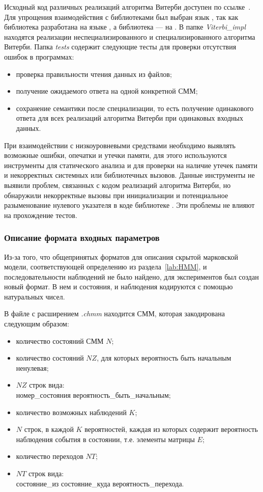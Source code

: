 Исходный код различных реализаций алгоритма Витерби доступен 
по ссылке~\cite{repo}.
Для упрощения взаимодействия с библиотеками был выбран язык 
\CPP, так как библиотека  
разработана на языке , а библиотека  --- на \CPP.
В папке \emph{Viterbi\_impl} находятся реализации
неспециализированного и специализированного алгоритма Витерби.
Папка \emph{tests} содержит следующие тесты для проверки 
отсутствия ошибок в программах:
\begin{itemize}
	\item проверка правильности чтения данных из файлов;
	\item получение ожидаемого ответа на одной конкретной СММ;
	\item сохранение семантики после специализации, то есть 
	получение одинакового ответа для всех реализаций 
	алгоритма Витерби при одинаковых входных данных.
\end{itemize} 
При взаимодействии с низкоуровневыми средствами
необходимо выявлять возможные ошибки, опечатки и утечки 
памяти, для этого используются инструменты  
для статического анализа и  для проверки на 
наличие утечек памяти и некорректных системных или 
библиотечных вызовов.
Данные инструменты не выявили проблем, связанных с кодом 
реализаций алгоритма Витерби, но обнаружили некорректные 
вызовы при инициализации  и потенциальное 
разыменование нулевого указателя в коде библиотеке .
Эти проблемы не влияют на прохождение тестов.

\subsubsection{Описание формата входных параметров}
\label{lab:formats}
Из-за того, что общепринятых форматов для описания скрытой 
марковской модели, соответствующей определению из 
раздела~\ref{lab:HMM}, и последовательности наблюдений не 
было найдено, для экспериментов был создан новый формат.
В нем и состояния, и наблюдения кодируются с помощью 
натуральных чисел.

В файле с расширением \emph{.chmm} находится СММ, которая закодирована следующим образом:
\begin{itemize}
	\item количество состояний СММ $N$;
	\item количество состояний $NZ$, для которых вероятность быть начальным ненулевая;
	\item $NZ$ строк вида:\\ 
	номер\_состояния вероятность\_быть\_начальным;
	\item количество возможных наблюдений $K$;
	\item $N$ строк, в каждой $K$ вероятностей, каждая из которых содержит вероятность наблюдения события в состоянии, т.е. элементы матрицы $E$;
	\item количество переходов $NT$;
	\item $NT$ строк вида:\\ состояние\_из состояние\_куда вероятность\_перехода.
\end{itemize}

